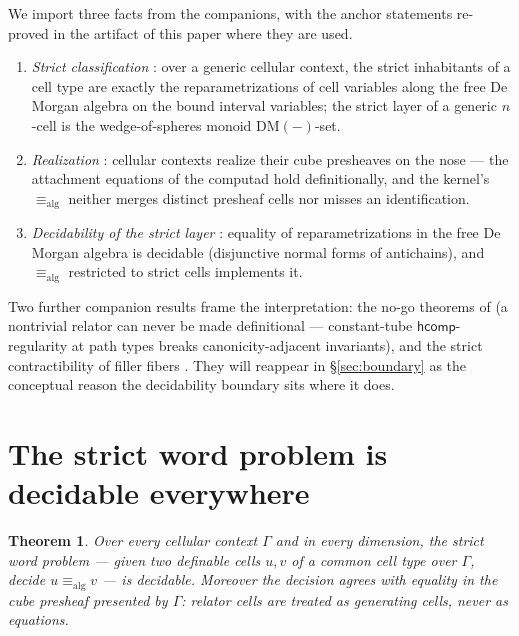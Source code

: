 \documentclass[11pt]{amsart}
\newtheorem{thm}{Theorem}[section]
\theoremstyle{definition}
\newcommand{\DM}[1]{\mathrm{DM}(#1)}
\newcommand{\aconv}{\equiv_{\mathrm{alg}}}
\newcommand{\hcomp}{\mathsf{hcomp}}
\begin{document}
We import three facts from the companions, with the anchor
statements re-proved in the artifact of this paper where they are
used.

\begin{enumerate}
\item[(K1)] \emph{Strict classification} \cite{Sphere}: over a
  generic cellular context, the strict inhabitants of a cell type
  are exactly the reparametrizations of cell variables along the
  free De Morgan algebra on the bound interval variables; the
  strict layer of a generic $n$-cell is the wedge-of-spheres
  monoid $\DM{-}$-set.
\item[(K2)] \emph{Realization} \cite{Realization}: cellular
  contexts realize their cube presheaves on the nose --- the
  attachment equations of the computad hold definitionally, and
  the kernel's $\aconv$ neither merges distinct presheaf cells nor
  misses an identification.
\item[(K3)] \emph{Decidability of the strict layer}
  \cite{Sphere,Realization}: equality of reparametrizations in the
  free De Morgan algebra is decidable (disjunctive normal forms of
  antichains), and $\aconv$ restricted to strict cells implements
  it.
\end{enumerate}

Two further companion results frame the interpretation: the no-go
theorems of \cite{Const,Convexity} (a nontrivial relator can never
be made definitional --- constant-tube $\hcomp$-regularity at path
types breaks canonicity-adjacent invariants), and the strict
contractibility of filler fibers \cite{Convexity}.  They will
reappear in \S\ref{sec:boundary} as the conceptual reason the
decidability boundary sits where it does.

\section{The strict word problem is decidable everywhere}
\label{sec:strict}

\begin{thm}
  \label{thm:strict}
  Over every cellular context $\Gamma$ and in every dimension, the
  strict word problem --- given two definable cells $u, v$ of a
  common cell type over $\Gamma$, decide $u \aconv v$ --- is
  decidable.  Moreover the decision agrees with equality in the cube
  presheaf presented by $\Gamma$: relator cells are treated as
  generating cells, never as equations.
\end{thm}
\end{document}
